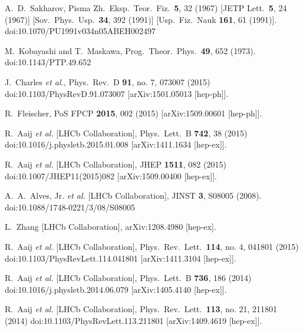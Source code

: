 \documentclass[10pt]{article}
\begin{document}
\begin{thebibliography}{99}



  A.~D.~Sakharov,
  Pisma Zh.\ Eksp.\ Teor.\ Fiz.\  {\bf 5}, 32 (1967)
  [JETP Lett.\  {\bf 5}, 24 (1967)]
  [Sov.\ Phys.\ Usp.\  {\bf 34}, 392 (1991)]
  [Usp.\ Fiz.\ Nauk {\bf 161}, 61 (1991)].
  doi:10.1070/PU1991v034n05ABEH002497



  M.~Kobayashi and T.~Maskawa,
  Prog.\ Theor.\ Phys.\  {\bf 49}, 652 (1973).
  doi:10.1143/PTP.49.652




  J.~Charles {\it et al.},
  Phys.\ Rev.\ D {\bf 91}, no. 7, 073007 (2015)
  doi:10.1103/PhysRevD.91.073007
  [arXiv:1501.05013 [hep-ph]].



  R.~Fleischer,
  PoS FPCP {\bf 2015}, 002 (2015)
  [arXiv:1509.00601 [hep-ph]].



  R.~Aaij {\it et al.} [LHCb Collaboration],
  Phys.\ Lett.\ B {\bf 742}, 38 (2015)
  doi:10.1016/j.physletb.2015.01.008
  [arXiv:1411.1634 [hep-ex]].



  R.~Aaij {\it et al.} [LHCb Collaboration],
  JHEP {\bf 1511}, 082 (2015)
  doi:10.1007/JHEP11(2015)082
  [arXiv:1509.00400 [hep-ex]].



  A.~A.~Alves, Jr. {\it et al.} [LHCb Collaboration],
  JINST {\bf 3}, S08005 (2008).
  doi:10.1088/1748-0221/3/08/S08005



  L.~Zhang [LHCb Collaboration],
  arXiv:1208.4980 [hep-ex].



  R.~Aaij {\it et al.} [LHCb Collaboration],
  Phys.\ Rev.\ Lett.\  {\bf 114}, no. 4, 041801 (2015)
  doi:10.1103/PhysRevLett.114.041801
  [arXiv:1411.3104 [hep-ex]].



  R.~Aaij {\it et al.} [LHCb Collaboration],
  Phys.\ Lett.\ B {\bf 736}, 186 (2014)
  doi:10.1016/j.physletb.2014.06.079
  [arXiv:1405.4140 [hep-ex]].



  R.~Aaij {\it et al.} [LHCb Collaboration],
  Phys.\ Rev.\ Lett.\  {\bf 113}, no. 21, 211801 (2014)
  doi:10.1103/PhysRevLett.113.211801
  [arXiv:1409.4619 [hep-ex]].




\end{thebibliography}
\end{document}
